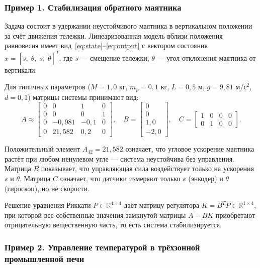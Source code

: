 \documentclass[12pt, a4paper, oneside]{extarticle}
\begin{document}
\subsubsection{Пример 1. Стабилизация обратного маятника}

Задача состоит в удержании неустойчивого маятника в вертикальном положении за
счёт движения тележки. Линеаризованная модель вблизи положения равновесия имеет
вид~\eqref{eq:state}--\eqref{eq:output} с вектором состояния
$x = [s,\;\theta,\;\dot{s},\;\dot{\theta}]^T$, где $s$ --- смещение тележки,
$\theta$ --- угол отклонения маятника от вертикали.

Для типичных параметров ($M = 1{,}0$ кг, $m_p = 0{,}1$ кг, $L = 0{,}5$ м,
$g = 9{,}81$ м/с$^2$, $d = 0{,}1$) матрицы системы принимают вид:
\[
A \approx
\begin{bmatrix}
0      & 0       & 1      & 0    \\
0      & 0       & 0      & 1    \\
0      & -0{,}981 & -0{,}1 & 0    \\
0      & 21{,}582 &  0{,}2 & 0
\end{bmatrix},\quad
B =
\begin{bmatrix} 0 \\ 0 \\ 1{,}0 \\ -2{,}0 \end{bmatrix},\quad
C =
\begin{bmatrix} 1 & 0 & 0 & 0 \\ 0 & 1 & 0 & 0 \end{bmatrix}.
\]

Положительный элемент $A_{42} = 21{,}582$ означает, что угловое ускорение
маятника растёт при любом ненулевом угле --- система неустойчива без управления.
Матрица $B$ показывает, что управляющая сила воздействует только на ускорения
$\ddot{s}$ и $\ddot{\theta}$. Матрица $C$ означает, что датчики измеряют только
$s$ (энкодер) и $\theta$ (гироскоп), но не скорости.

Решение уравнения Риккати $P \in \mathbb{R}^{4 \times 4}$ даёт матрицу
регулятора $K = B^T P \in \mathbb{R}^{1 \times 4}$, при которой все собственные
значения замкнутой матрицы $A - BK$ приобретают отрицательную вещественную
часть, то есть система стабилизируется.

\subsubsection{Пример 2. Управление температурой в трёхзонной промышленной печи}
\end{document}
